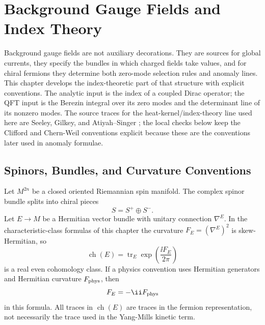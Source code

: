 \chapter{Background Gauge Fields and Index Theory}
\label{ch:curved-background-gauge-fields-index-theory}

\ConventionsEuclidean

Background gauge fields are not auxiliary decorations.  They are sources for
global currents, they specify the bundles in which charged fields take
values, and for chiral fermions they determine both zero-mode selection
rules and anomaly lines.  This chapter develops the index-theoretic part of
that structure with explicit conventions.  The analytic input is the index
of a coupled Dirac operator; the QFT input is the Berezin integral over its
zero modes and the determinant line of its nonzero modes.
The source traces for the heat-kernel/index-theory line used here are
Seeley, Gilkey, and Atiyah--Singer
\cite{Seeley1967,Gilkey1984,AtiyahSinger1968}; the local checks below keep the
Clifford and Chern-Weil conventions explicit because these are the conventions
later used in anomaly formulae.

\section{Spinors, Bundles, and Curvature Conventions}

Let \(M^{2n}\) be a closed oriented Riemannian spin manifold.  The complex
spinor bundle splits into chiral pieces
\[
  S=S^+\oplus S^- .
\]
Let \(E\to M\) be a Hermitian vector bundle with unitary connection
\(\nabla^E\).  In the characteristic-class formulas of this chapter the
curvature \(F_E=(\nabla^E)^2\) is skew-Hermitian, so
\[
  \operatorname{ch}(E)
  =
  \operatorname{tr}_E\exp\!\left(\frac{\ii F_E}{2\pi}\right)
\]
is a real even cohomology class.  If a physics convention uses Hermitian
generators and Hermitian curvature \(F_{\rm phys}\), then
\[
  F_E=-\ii F_{\rm phys}
\]
in this formula.  All traces in \(\operatorname{ch}(E)\) are traces in the
fermion representation, not necessarily the trace used in the Yang-Mills
kinetic term.

